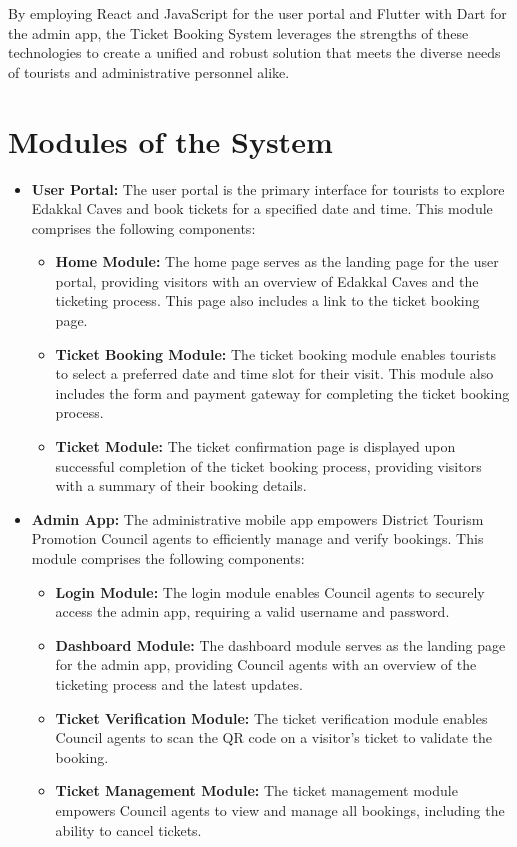 \documentclass[12pt,a4paper]{report}
\begin{document}
By employing React and JavaScript for the user portal and Flutter with Dart for the admin app, the Ticket Booking System leverages the strengths of these technologies to create a unified and robust solution that meets the diverse needs of tourists and administrative personnel alike.


\section{Modules of the System}

\begin{itemize}
    \item \textbf{User Portal:} The user portal is the primary interface for tourists to explore Edakkal Caves and book tickets for a specified date and time. This module comprises the following components:
          \begin{itemize}
              \item \textbf{Home Module:} The home page serves as the landing page for the user portal, providing visitors with an overview of Edakkal Caves and the ticketing process. This page also includes a link to the ticket booking page.
              \item \textbf{Ticket Booking Module:} The ticket booking module enables tourists to select a preferred date and time slot for their visit. This module also includes the form and payment gateway for completing the ticket booking process.
              \item \textbf{Ticket Module:} The ticket confirmation page is displayed upon successful completion of the ticket booking process, providing visitors with a summary of their booking details.
          \end{itemize}

    \item \textbf{Admin App:} The administrative mobile app empowers District Tourism Promotion Council agents to efficiently manage and verify bookings. This module comprises the following components:
          \begin{itemize}
              \item \textbf{Login Module:} The login module enables Council agents to securely access the admin app, requiring a valid username and password.
              \item \textbf{Dashboard Module:} The dashboard module serves as the landing page for the admin app, providing Council agents with an overview of the ticketing process and the latest updates.
              \item \textbf{Ticket Verification Module:} The ticket verification module enables Council agents to scan the QR code on a visitor's ticket to validate the booking.
              \item \textbf{Ticket Management Module:} The ticket management module empowers Council agents to view and manage all bookings, including the ability to cancel tickets.
          \end{itemize}
\end{itemize}
\end{document}
